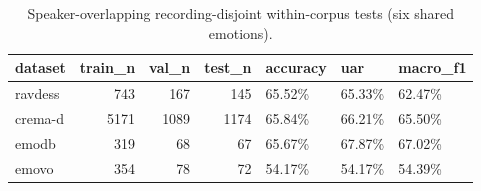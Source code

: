 \begin{table}
\caption{Speaker-overlapping recording-disjoint within-corpus tests (six shared emotions).}
\begin{tabular}{lrrrlll}
\toprule
dataset & train_n & val_n & test_n & accuracy & uar & macro_f1 \\
\midrule
ravdess & 743 & 167 & 145 & 65.52\% & 65.33\% & 62.47\% \\
crema-d & 5171 & 1089 & 1174 & 65.84\% & 66.21\% & 65.50\% \\
emodb & 319 & 68 & 67 & 65.67\% & 67.87\% & 67.02\% \\
emovo & 354 & 78 & 72 & 54.17\% & 54.17\% & 54.39\% \\
\bottomrule
\end{tabular}
\end{table}
